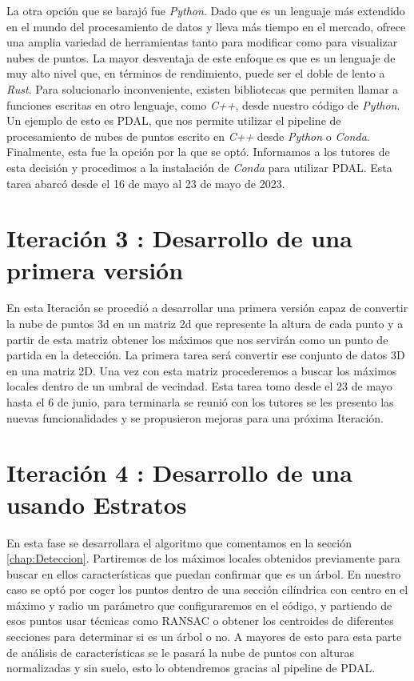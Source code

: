 La otra opción que se barajó fue \textit{Python}. Dado que es un lenguaje más extendido en el mundo del procesamiento de datos y lleva más tiempo en el mercado, ofrece una amplia variedad de herramientas tanto para modificar como para visualizar nubes de puntos. La mayor desventaja de este enfoque es que es un lenguaje de muy alto nivel que, en términos de rendimiento, puede ser el doble de lento a \textit{Rust}. Para solucionarlo inconveniente, existen bibliotecas que permiten llamar a funciones escritas en otro lenguaje, como \textit{C++}, desde nuestro código de \textit{Python}. Un ejemplo de esto es PDAL, que nos permite utilizar el pipeline de procesamiento de nubes de puntos escrito en \textit{C++} desde \textit{Python} o \textit{Conda}. Finalmente, esta fue la opción por la que se optó. Informamos a los tutores de esta decisión y procedimos a la instalación de \textit{Conda} para utilizar PDAL. Esta tarea abarcó desde el 16 de mayo al 23 de mayo de 2023.


\section{Iteración 3 : Desarrollo de una primera versión}
En esta Iteración se procedió a desarrollar una primera versión capaz de convertir la nube de puntos 3d en un matriz 2d que represente la altura de cada punto y a partir de esta matriz obtener los máximos que nos servirán como un punto de partida en la detección.
La primera tarea será convertir ese conjunto de datos 3D en una matriz 2D. Una vez con esta matriz procederemos a buscar los máximos locales dentro de un umbral de vecindad. Esta tarea tomo desde el 23 de mayo hasta el 6 de junio, para terminarla se reunió con los tutores se les presento las nuevas funcionalidades y se propusieron mejoras para una próxima Iteración. 

\section{Iteración 4 : Desarrollo de una  usando Estratos }
En esta fase se desarrollara el algoritmo que comentamos en la sección \ref{chap:Deteccion}. Partiremos de los máximos locales obtenidos previamente para buscar en ellos características que puedan confirmar que es un árbol. En nuestro caso se optó por coger los puntos dentro de una sección cilíndrica con centro en el máximo y radio un parámetro que configuraremos en el código, y partiendo de esos puntos usar técnicas como RANSAC o obtener los centroides de diferentes secciones para determinar si es un árbol o no. A mayores de esto para esta parte de análisis de características se le pasará la nube de puntos con alturas normalizadas y sin suelo, esto lo obtendremos gracias al pipeline de PDAL.

